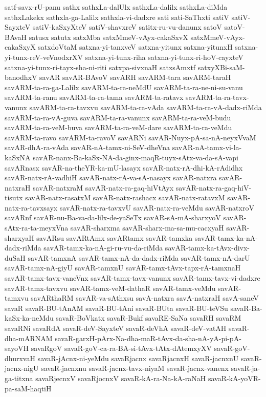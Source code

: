{satf-savx-rU-panu
sathx
sathxLa-dalUlx
sathxLa-dalilx
sathxLa-diMda
sathxLakekx
sathxla-ga-Lalilx
sathxla-vi-dadxre
sati
sati-SaThxti
satiV
satiV-SayxteV
satiV-kaSxyXteV
satiV-shavxreV
satitx-ru-vu-danunx
satoV
satoV-BAvaH
satusx
satutx
satxMba
satxMmeV-vAyx-cakaSxvX
satxMmeV-vAyx-cakaSxyX
satxdoVtaM
satxna-yi-tanxveV
satxna-yitunx
satxna-yitunxH
satxna-yi-tunx-reV-veVnodxrXV
satxna-yi-tunx-riha
satxna-yi-tunx-ri-hoV-cayxteV
satxna-yi-tunx-ri-tayx-sha-ni-riti
satxpa-sivxnaH
satxsAmxtf
satxyXBi-saM-banodhxV
savAR
savAR-BAvoV
savARH
savARM-tara
savARM-taraH
savARM-ta-ra-ga-Lalilx
savARM-ta-ra-neMdU
savARM-ta-ra-ne-ni-su-vanu
savARM-ta-ranu
savARM-ta-ra-tama
savARM-ta-ratavx
savARM-ta-ra-tavx-vanunx
savARM-ta-ra-tavxvu
savARM-ta-ra-vAda
savARM-ta-ra-vA-dadx-riMda
savARM-ta-ra-vA-guva
savARM-ta-ra-vanunx
savARM-ta-ra-veM-budu
savARM-ta-ra-veM-buva
savARM-ta-ra-veM-dare
savARM-ta-ra-veMdu
savARM-ta-ravo
savARM-ta-ravoV
savARNi
savAR-Nuyx-pA-sa-nA-neyxVvaM
savAR-dhA-ra-vAda
savAR-nA-tamx-ni-SeV-dheVna
savAR-nA-tamx-vi-la-kaSxNA
savAR-nanx-Ba-kaSx-NA-da-ginx-maqR-tuyx-sAtx-va-da-sA-vapi
savARnasx
savAR-na-theYR-ka-mU-lasayx
savAR-natx-rA-dhi-kA-rAdidhx
savAR-natx-rA-vadhiH
savAR-natx-rA-va-sA-nasayx
savAR-natxra
savAR-natxraH
savAR-natxraM
savAR-natx-ra-gaq-hiVtAyx
savAR-natx-ra-gaq-hiV-tisutx
savAR-natx-rasatxM
savAR-natx-rashacx
savAR-natx-ratavxM
savAR-natx-ra-tavxsayx
savAR-natx-ra-tavxvU
savAR-natx-ra-veMdu
savAR-natxroV
savARnf
savAR-nu-Ba-va-da-lilx-de-yaSeTx
savAR-sA-mA-sharxyoV
savAR-sAtx-ra-ta-meyxVna
savAR-sharxma
savAR-sharx-ma-sa-mu-cacxyaH
savAR-sharxyaH
savARsu
savARtAmx
savARtamx
savAR-tamxka
savAR-tamx-ka-nA-dadx-riMda
savAR-tamx-ka-nA-gi-ru-vu-da-riMda
savAR-tamx-ka-tAvx-divx-duSaH
savAR-tamxnA
savAR-tamx-nA-da-dadx-riMda
savAR-tamx-nA-darU
savAR-tamx-nA-giyU
savAR-tamxnU
savAR-tamx-tAvx-tapx-rA-tamxnaH
savAR-tamx-tavx-vaneVnx
savAR-tamx-tavx-vanunx
savAR-tamx-tavx-vi-dadxre
savAR-tamx-tavxvu
savAR-tamx-veM-dathaR
savAR-tamx-veMdu
savAR-tamxvu
savARthaRM
savAR-va-sAthxsu
savA-natxra
savA-natxraH
savA-saneV
savaR
savaR-BU-tAnAM
savaR-BU-tAni
savaR-BUta
savaR-BU-teVSu
savaR-Ba-kaSx-ka-neMdu
savaR-BoVkatx
savaR-Bukf
savaRE-SaNa
savaRH
savaRM
savaRNi
savaRdA
savaR-deV-SayxteV
savaR-deVhA
savaR-deV-vatAH
savaR-dha-mARNAM
savaR-garxH-pArx-Na-dha-maR-tAvx-da-sha-nA-yA-pi-pA-sayoVH
savaRgoV
savaR-goV-ca-ra-BA-si-tAvx-tAtx-dAtemxyXV
savaR-goV-dhurxvaH
savaR-jAcnx-ni-yeMdu
savaRjacnx
savaRjacnxH
savaR-jacnxnU
savaR-jacnx-nigU
savaR-jacnxnu
savaR-jacnx-tavx-niyaM
savaR-jacnx-vanenx
savaR-ja-ga-titxna
savaRjecnxV
savaRjocnxV
savaR-kA-ra-Na-kA-raNaH
savaR-kA-yoVR-pa-saM-haqtiH
}
